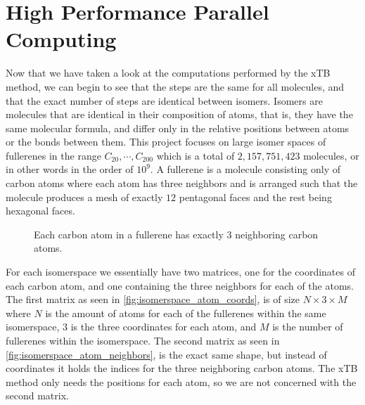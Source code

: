 \chapter{High Performance Parallel Computing}\label{sec:hppc}

Now that we have taken a look at the computations performed by the xTB method, we can begin to see that the steps are the same for all molecules, and that the exact number of steps are identical between isomers. Isomers are molecules that are identical in their composition of atoms, that is, they have the same molecular formula, and differ only in the relative positions between atoms or the bonds between them.
This project focuses on large isomer spaces of fullerenes in the range \(C_{20}, \cdots, C_{200} \) which is a total of $2,157,751,423$ molecules, or in other words in the order of $10^9$. A fullerene is a molecule consisting only of carbon atoms where each atom has three neighbors and is arranged such that the molecule produces a mesh of exactly $12$ pentagonal faces and the rest being hexagonal faces.

\begin{figure}[H]
\centering
{}
\caption{Each carbon atom in a fullerene has exactly 3 neighboring carbon atoms.}
\label{fig:carbon-degree}
\end{figure}

For each isomerspace we essentially have two matrices, one for the coordinates of each carbon atom, and one containing the three neighbors for each of the atoms. The first matrix as seen in \autoref{fig:isomerspace_atom_coords}, is of size $N \times 3 \times M$ where $N$ is the amount of atoms for each of the fullerenes within the same isomerspace, $3$ is the three coordinates for each atom, and $M$ is the number of fullerenes within the isomerspace. The second matrix as seen in \autoref{fig:isomerspace_atom_neighbors}, is the exact same shape, but instead of coordinates it holds the indices for the three neighboring carbon atoms. The xTB method only needs the positions for each atom, so we are not concerned with the second matrix.

